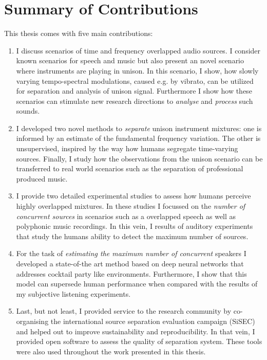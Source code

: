 \clearpage
\section{Summary of Contributions}

This thesis comes with five main contributions:

\begin{enumerate}
\item I discuss scenarios of time and frequency overlapped audio sources.
I consider known scenarios for speech and music but also present an novel scenario where instruments are playing in unison.
In this scenario, I show, how slowly varying tempo-spectral modulations, caused e.g. by vibrato, can be utilized for separation and analysis of unison signal.
Furthermore I show how these scenarios can stimulate new research directions to \emph{analyse} and \emph{process} such sounds.\\

\item I developed two novel methods to \emph{separate} unison instrument mixtures: one is informed by an estimate of the fundamental frequency variation.
The other is unsupervised, inspired by the way how humans segregate time-varying sources.
Finally, I study how the observations from the unison scenario can be transferred to real world scenarios such as the separation of professional produced music.\\

\item I provide two detailed experimental studies to assess how humans perceive highly overlapped mixtures.
In these studies I focussed on the \emph{number of concurrent sources} in scenarios such as a overlapped speech as well as polyphonic music recordings.
In this vein, I results of auditory experiments that study the humans ability to detect the maximum number of sources.\\

\item For the task of \emph{estimating the maximum number of concurrent} speakers I developed a state-of-the art method based on deep neural networks that addresses cocktail party like environments.
Furthermore, I show that this model can supersede human performance when compared with the results of my subjective listening experiments.\\

\item Last, but not least, I provided service to the research community by co-organising the international source separation evaluation campaign (SiSEC) and helped out to improve sustainability and reproducibility.
In that vein, I provided open software to assess the quality of separation system. 
These tools were also used throughout the work presented in this thesis.
\end{enumerate}


